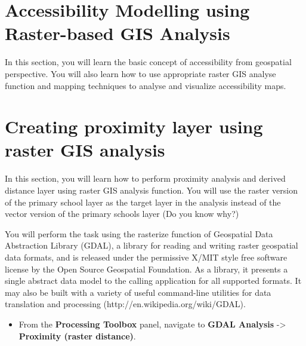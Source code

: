 \documentclass[
  letterpaper,
  DIV=11,
  numbers=noendperiod]{scrreprt}
\providecommand{\tightlist}{%
  \setlength{\itemsep}{0pt}\setlength{\parskip}{0pt}}\usepackage{longtable,booktabs,array}
\begin{document}
\hypertarget{accessibility-modelling-using-raster-based-gis-analysis}{%
\section{Accessibility Modelling using Raster-based GIS
Analysis}\label{accessibility-modelling-using-raster-based-gis-analysis}}

In this section, you will learn the basic concept of accessibility from
geospatial perspective. You will also learn how to use appropriate
raster GIS analyse function and mapping techniques to analyse and
visualize accessibility maps.

\hypertarget{creating-proximity-layer-using-raster-gis-analysis}{%
\section{Creating proximity layer using raster GIS
analysis}\label{creating-proximity-layer-using-raster-gis-analysis}}

In this section, you will learn how to perform proximity analysis and
derived distance layer using raster GIS analysis function. You will use
the raster version of the primary school layer as the target layer in
the analysis instead of the vector version of the primary schools layer
(Do you know why?)

You will perform the task using the rasterize function of Geospatial
Data Abstraction Library (GDAL), a library for reading and writing
raster geospatial data formats, and is released under the permissive
X/MIT style free software license by the Open Source Geospatial
Foundation. As a library, it presents a single abstract data model to
the calling application for all supported formats. It may also be built
with a variety of useful command-line utilities for data translation and
processing (http://en.wikipedia.org/wiki/GDAL).

\begin{itemize}
\tightlist
\item
  From the \textbf{Processing Toolbox} panel, navigate to \textbf{GDAL
  Analysis} -\textgreater{} \textbf{Proximity (raster distance)}.
\end{itemize}
\end{document}
